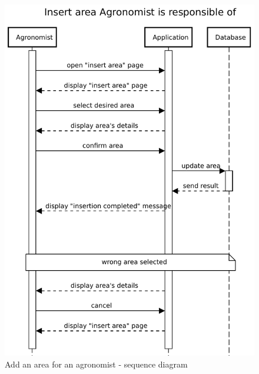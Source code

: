 \begin{figure}[H]
    \centering
    \includegraphics[scale=0.75]{Images/Sequence diagrams/Agronomist - Insert area.pdf}
    \caption{Add an area for an agronomist - sequence diagram}
    \label{fig:my_label}
\end{figure}



